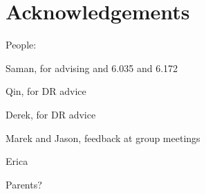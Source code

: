 \chapter*{Acknowledgements}

People:

Saman, for advising and 6.035 and 6.172

Qin, for DR advice

Derek, for DR advice

Marek and Jason, feedback at group meetings

Erica

Parents?
